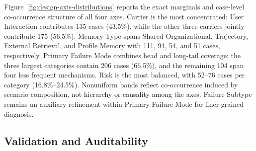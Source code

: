 \documentclass[letterpaper]{article}
\begin{document}
Figure~\ref{fig:design-axis-distributions} reports the exact marginals and case-level co-occurrence structure of all four axes. Carrier is the most concentrated: User Interaction contributes 135 cases (43.5\%), while the other three carriers jointly contribute 175 (56.5\%). Memory Type spans Shared Organizational, Trajectory, External Retrieval, and Profile Memory with 111, 94, 54, and 51 cases, respectively. Primary Failure Mode combines head and long-tail coverage: the three largest categories contain 206 cases (66.5\%), and the remaining 104 span four less frequent mechanisms. Risk is the most balanced, with 52--76 cases per category (16.8\%--24.5\%). Nonuniform bands reflect co-occurrence induced by scenario composition, not hierarchy or causality among the axes. Failure Subtype remains an auxiliary refinement within Primary Failure Mode for finer-grained diagnosis.

\subsection{Validation and Auditability}
\label{app:construction-taxonomy:validation-auditability}
\end{document}
